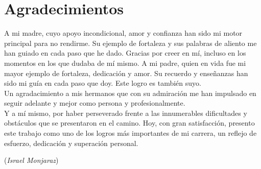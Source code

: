 \documentclass[11pt,a4paper]{article}
\begin{document}
			\section*{Agradecimientos}
	{\itshape
		
		
		A mi madre, cuyo apoyo incondicional, amor y confianza han sido mi motor principal para no rendirme. Su ejemplo de fortaleza y sus palabras de aliento me han guiado en cada paso que he dado. Gracias por creer en mí, incluso en los momentos en los que dudaba de mí mismo. A mi padre, quien en vida fue mi mayor ejemplo de fortaleza, dedicación y amor. Su recuerdo y enseñanzas han sido mi guía en cada paso que doy. Este logro es también suyo.\\
		
		Un agradacimiento a mis hermanos que con su admiración me han impulsado en seguir adelante y mejor como persona y profesionalmente.\\
		
		Y a mí mismo, por haber perseverado frente a las innumerables dificultades y obstáculos que se presentaron en el camino. Hoy, con gran satisfacción, presento este trabajo como uno de los logros más importantes de mi carrera, un reflejo de esfuerzo, dedicación y superación personal. \\
	}
	\begin{flushright}
		(\textit{Israel Monjaraz})
	\end{flushright}
	
	\newpage
	
	
\end{document}
